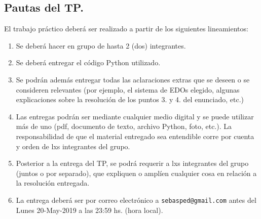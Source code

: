 \documentclass[a4paper,11pt,landscape,twocolumn]{article}
\begin{document}
\subsection*{Pautas del TP.}
El trabajo práctico deberá ser realizado a partir de los siguientes lineamientos:
\begin{enumerate}
	\item Se deberá hacer en grupo de hasta 2 (dos) integrantes.
	\item Se deberá entregar el código Python utilizado.
	\item Se podrán además entregar todas las aclaraciones extras que se deseen o se consideren relevantes (por ejemplo, el sistema de EDOs elegido, algunas explicaciones sobre la resolución de los puntos 3. y 4. del enunciado, etc.)
	\item Las entregas podrán ser mediante cualquier medio digital y se puede utilizar más de uno (pdf, documento de texto, archivo Python, foto, etc.). La responsabilidad de que el material entregado sea entendible corre por cuenta y orden de lxs integrantes del grupo.
	\item Posterior a la entrega del TP, se podrá requerir a lxs integrantes del grupo (juntos o por separado), que expliquen o amplíen cualquier cosa en relación a la resolución entregada.
	\item La entrega deberá ser por correo electrónico a \verb|sebasped@gmail.com| antes del Lunes 20-May-2019 a las 23:59 hs. (hora local).
\end{enumerate}
\end{document}
